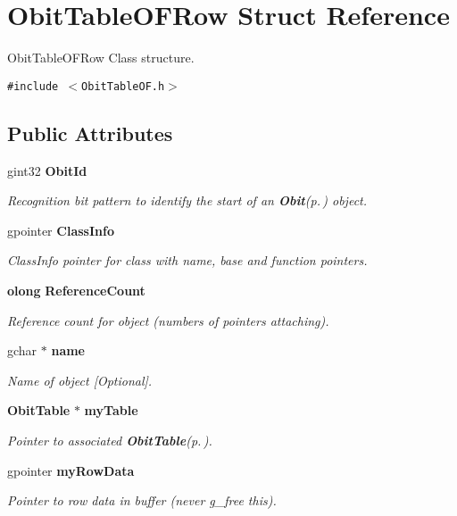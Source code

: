 \section{Obit\-Table\-OFRow Struct Reference}
\label{structObitTableOFRow}
Obit\-Table\-OFRow Class structure.  


{\tt \#include $<$Obit\-Table\-OF.h$>$}

\subsection*{Public Attributes}
\begin{CompactItemize}
\item 
gint32 {\bf Obit\-Id}
\begin{CompactList}\small\item\em Recognition bit pattern to identify the start of an {\bf Obit}{\rm (p.\,\pageref{structObit})} object. \item\end{CompactList}\item 
gpointer {\bf Class\-Info}
\begin{CompactList}\small\item\em Class\-Info pointer for class with name, base and function pointers. \item\end{CompactList}\item 
{\bf olong} {\bf Reference\-Count}
\begin{CompactList}\small\item\em Reference count for object (numbers of pointers attaching). \item\end{CompactList}\item 
gchar $\ast$ {\bf name}
\begin{CompactList}\small\item\em Name of object [Optional]. \item\end{CompactList}\item 
{\bf Obit\-Table} $\ast$ {\bf my\-Table}
\begin{CompactList}\small\item\em Pointer to associated {\bf Obit\-Table}{\rm (p.\,\pageref{structObitTable})}. \item\end{CompactList}\item 
gpointer {\bf my\-Row\-Data}
\begin{CompactList}\small\item\em Pointer to row data in buffer (never g\_\-free this). \item\end{CompactList}\item 

\end{CompactItemize}
